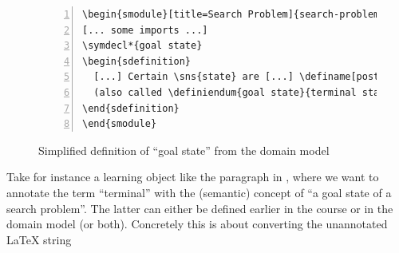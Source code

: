 \documentclass[runningheads]{llncs}
\begin{document}
\begin{figure}[h]\centering
\begin{lstlisting}[morekeywords={definame,symdecl,definiendum},numbers=left,
escapechar=!]
\begin{smodule}[title=Search Problem]{search-problem}
[... some imports ...]
\symdecl*{goal state}
\begin{sdefinition}
  [...] Certain \sns{state} are [...] \definame[post=s]{goal state} [...]
  (also called \definiendum{goal state}{terminal states}).
\end{sdefinition}
\end{smodule}
\end{lstlisting}
  \caption{Simplified definition of ``goal state'' from the domain model}\label{fig:state-space}
\end{figure}


Take for instance a learning object like the paragraph in , where we want to
annotate the term ``terminal'' with the (semantic) concept of ``a goal state of a search
problem''. The latter can either be defined earlier in the course or in the domain model
(or both). Concretely this is about converting the unannotated {\LaTeX} string
\end{document}

